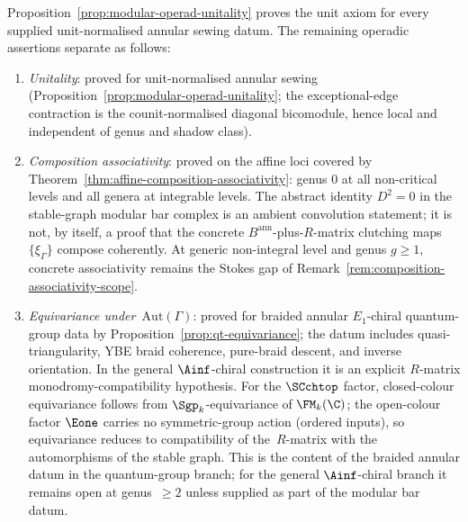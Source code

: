 \begin{remark}
\label{rem:modular-operad-axiom-separation}
Proposition~\ref{prop:modular-operad-unitality} proves the unit axiom
for every supplied unit-normalised annular sewing datum.  The
remaining operadic assertions separate as follows:
\begin{enumerate}[label=\textup{(\alph*)}]
\item \emph{Unitality}: proved for unit-normalised annular sewing
 (Proposition~\ref{prop:modular-operad-unitality}; the
 exceptional-edge contraction is the counit-normalised diagonal
 bicomodule, hence local and independent of genus and shadow class).
\item \emph{Composition associativity}: proved on the affine loci
covered by Theorem~\ref{thm:affine-composition-associativity}: genus
\(0\) at all non-critical levels and all genera at integrable levels.
The abstract identity \(D^2=0\) in the stable-graph modular bar complex
is an ambient convolution statement; it is not, by itself, a proof that
the concrete \(B^{\mathrm{ann}}\)-plus-\(R\)-matrix clutching maps
\(\{\xi_\Gamma\}\) compose coherently.  At generic non-integral level
and genus \(g\ge 1\), concrete associativity remains the Stokes gap of
Remark~\ref{rem:composition-associativity-scope}.
\item \emph{Equivariance under~$\mathrm{Aut}(\Gamma)$}: proved for
braided annular \(E_1\)-chiral quantum-group data by
Proposition~\ref{prop:qt-equivariance}; the datum includes
quasi-triangularity, YBE braid coherence, pure-braid descent, and
inverse orientation.  In the general \(\Ainf\)-chiral construction it
is an explicit \(R\)-matrix monodromy-compatibility hypothesis.
 For the $\SCchtop$ factor, closed-colour equivariance follows
 from $\Sgp_k$-equivariance of $\FM_k(\C)$; the open-colour
 factor $\Eone$ carries no symmetric-group action
 \textup{(}ordered inputs\textup{)}, so equivariance reduces to
 compatibility of the~$R$-matrix with the automorphisms of the
 stable graph. This is the content of the braided annular datum in
 the quantum-group branch; for the general \(\Ainf\)-chiral branch it
 remains open at genus~$\ge 2$ unless supplied as part of the modular
 bar datum.
\end{enumerate}
\end{remark}

